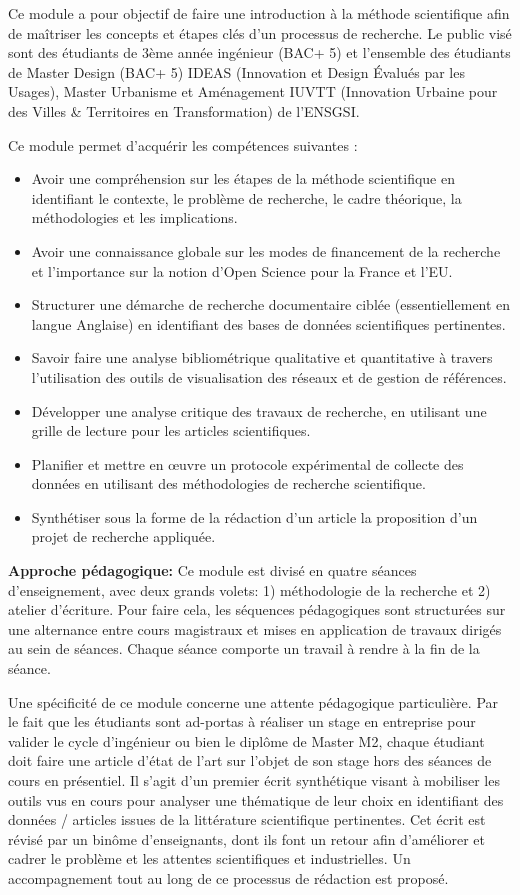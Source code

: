 \documentclass[
  11pt,
]{article}
\providecommand{\tightlist}{%
  \setlength{\itemsep}{0pt}\setlength{\parskip}{0pt}}\usepackage{longtable,booktabs,array}
\begin{document}
Ce module a pour objectif de faire une introduction à la méthode
scientifique afin de maîtriser les concepts et étapes clés d'un
processus de recherche. Le public visé sont des étudiants de 3ème année
ingénieur (BAC+ 5) et l'ensemble des étudiants de Master Design (BAC+ 5)
IDEAS (Innovation et Design Évalués par les Usages), Master Urbanisme et
Aménagement IUVTT (Innovation Urbaine pour des Villes \& Territoires en
Transformation) de l'ENSGSI.

Ce module permet d'acquérir les compétences suivantes :

\begin{itemize}
\tightlist
\item
  Avoir une compréhension sur les étapes de la méthode scientifique en
  identifiant le contexte, le problème de recherche, le cadre théorique,
  la méthodologies et les implications.
\item
  Avoir une connaissance globale sur les modes de financement de la
  recherche et l'importance sur la notion d'Open Science pour la France
  et l'EU.
\item
  Structurer une démarche de recherche documentaire ciblée
  (essentiellement en langue Anglaise) en identifiant des bases de
  données scientifiques pertinentes.
\item
  Savoir faire une analyse bibliométrique qualitative et quantitative à
  travers l'utilisation des outils de visualisation des réseaux et de
  gestion de références.
\item
  Développer une analyse critique des travaux de recherche, en utilisant
  une grille de lecture pour les articles scientifiques.
\item
  Planifier et mettre en œuvre un protocole expérimental de collecte des
  données en utilisant des méthodologies de recherche scientifique.
\item
  Synthétiser sous la forme de la rédaction d'un article la proposition
  d'un projet de recherche appliquée.
\end{itemize}

\textbf{Approche pédagogique:} Ce module est divisé en quatre séances
d'enseignement, avec deux grands volets: 1) méthodologie de la recherche
et 2) atelier d'écriture. Pour faire cela, les séquences pédagogiques
sont structurées sur une alternance entre cours magistraux et mises en
application de travaux dirigés au sein de séances. Chaque séance
comporte un travail à rendre à la fin de la séance.

Une spécificité de ce module concerne une attente pédagogique
particulière. Par le fait que les étudiants sont ad-portas à réaliser un
stage en entreprise pour valider le cycle d'ingénieur ou bien le diplôme
de Master M2, chaque étudiant doit faire une article d'état de l'art sur
l'objet de son stage hors des séances de cours en présentiel. Il s'agit
d'un premier écrit synthétique visant à mobiliser les outils vus en
cours pour analyser une thématique de leur choix en identifiant des
données / articles issues de la littérature scientifique pertinentes.
Cet écrit est révisé par un binôme d'enseignants, dont ils font un
retour afin d'améliorer et cadrer le problème et les attentes
scientifiques et industrielles. Un accompagnement tout au long de ce
processus de rédaction est proposé.
\end{document}
